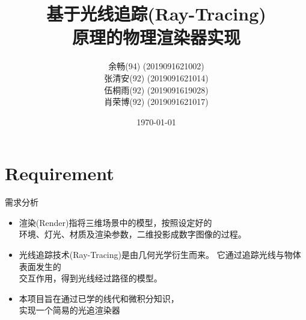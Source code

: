 \documentclass{beamer}
\begin{document}
\title[\sc Ray-Traing based Renderer]{\sc 基于光线追踪(Ray-Tracing) \\ 原理的物理渲染器实现}
\author{ \normalsize 余畅(94) \quad \tiny (2019091621002) \\
 \normalsize 张清安(92) \qquad \tiny (2019091621014) \\
 \normalsize 伍桐雨(92) \quad \tiny (2019091619028) \\
 \normalsize 肖荣博(92) \quad \tiny (2019091621017)}
\date{\today}
\frame{\titlepage}

\section{Requirement}
\begin{frame} {需求分析}
		\begin{itemize}
\item 渲染(Render)指将三维场景中的模型，按照设定好的 \\ 环境、灯光、材质及渲染参数，二维投影成数字图像的过程。
\item 光线追踪技术(Ray-Tracing)是由几何光学衍生而来。 它通过追踪光线与物体表面发生的 \\ 交互作用，得到光线经过路径的模型。
\item 本项目旨在通过已学的线代和微积分知识，\\实现一个简易的光追渲染器
\end{itemize}
\end{frame}
\end{document}

